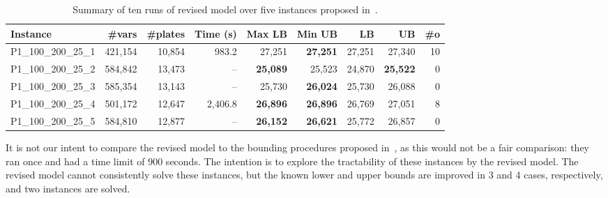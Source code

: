 \begin{table}
\caption{Summary of ten runs of revised model over five instances proposed in~\cite{velasco:2019}.}
\setlength\tabcolsep{2.5px}
\begin{tabular}{lrrrrrrrr}
Instance & \#vars & \#plates & Time (s)& Max LB & Min UB & \cite{velasco:2019} LB & \cite{velasco:2019} UB & \#o\\
\hline
P1\_100\_200\_25\_1 & 421,154 & 10,854 & 983.2 & 27,251 & \bf{27,251} & 27,251 & 27,340 & 10 \\
P1\_100\_200\_25\_2 & 584,842 & 13,473 & -- & \bf{25,089} & 25,523 & 24,870 & \bf{25,522} & 0 \\
P1\_100\_200\_25\_3 & 585,354 & 13,143 & -- & 25,730 & \bf{26,024} & 25,730 & 26,088 & 0 \\
P1\_100\_200\_25\_4 & 501,172 & 12,647 & 2,406.8 & \bf{26,896} & \bf{26,896} & 26,769 & 27,051 & 8 \\
P1\_100\_200\_25\_5 & 584,810 & 12,877 & -- & \bf{26,152} & \bf{26,621} & 25,772 & 26,857 & 0 \\
\hline
\end{tabular}
\label{tab:velasco_five}
\end{table}

It is not our intent to compare the revised model to the bounding procedures proposed in~\cite{velasco:2019}, as this would not be a fair comparison: they ran once and had a time limit of 900 seconds.
The intention is to explore the tractability of these instances by the revised model.
The revised model cannot consistently solve these instances, but the known lower and upper bounds are improved in 3 and 4 cases, respectively, and two instances are solved.


